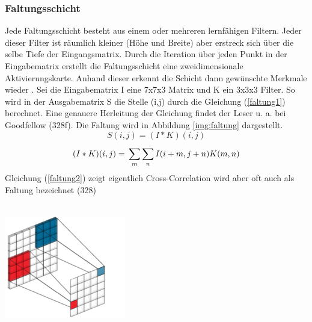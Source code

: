 \documentclass[twosided,a4,10pt]{article}
\begin{document}
\begin{multicols}{2}
		\subsubsection*{Faltungsschicht}
		Jede Faltungsschicht besteht aus einem oder mehreren lernfähigen Filtern. Jeder dieser Filter ist räumlich kleiner (Höhe und Breite) aber erstreck sich über die selbe Tiefe der Eingangsmatrix. Durch die Iteration über jeden Punkt in der Eingabematrix erstellt die Faltungsschicht eine zweidimensionale Aktivierungskarte. Anhand dieser erkennt die Schicht dann gewünschte Merkmale wieder \cite{karpathy}.\newline
		Sei die Eingabematrix I eine 7x7x3 Matrix und K ein 3x3x3 Filter. So wird in der Ausgabematrix S die Stelle (i,j) durch die Gleichung (\ref{faltung1}) berechnet. Eine genauere Herleitung der Gleichung findet der Leser u. a. bei Goodfellow \cite{goodfellow}(328f). Die Faltung wird in Abbildung \ref{img:faltung} dargestellt.
		\begin{equation}\label{faltung1}
		S(i,j) =(I \ast K)(i,j)
		\end{equation}
		\begin{equation}\label{faltung2}
		(I \ast K)(i,j) =\newline\sum_{m}^{}\sum_{n}^{}I(i+m,j+n)K(m,n)
		\end{equation}
		Gleichung (\ref{faltung2}) zeigt eigentlich Cross-Correlation wird aber oft auch als Faltung bezeichnet \cite{goodfellow}(328)\\
		\\
		\begin{minipage}{0.45\textwidth}
			\centering
			\includegraphics{img/faltung-klein.png}
			\label{img:faltung}
		\end{minipage}
		

\end{multicols}
\end{document}
